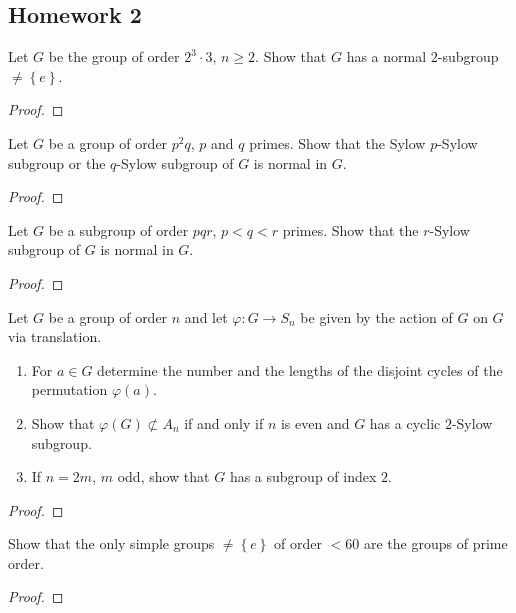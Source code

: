 \subsection{Homework 2}
\begin{problem}
Let $G$ be the group of order $2^3\cdot 3$, $n\geq 2$. Show that $G$ has a
normal $2$-subgroup $\neq\left\{e\right\}$.
\end{problem}
\begin{proof}
\end{proof}

\begin{problem}
Let $G$ be a group of order $p^2q$, $p$ and $q$ primes. Show that the Sylow
$p$-Sylow subgroup or the $q$-Sylow subgroup of $G$ is normal in $G$.
\end{problem}
\begin{proof}
\end{proof}

\begin{problem}
Let $G$ be a subgroup of order $pqr$, $p<q<r$ primes. Show that the
$r$-Sylow subgroup of $G$ is normal in $G$.
\end{problem}
\begin{proof}
\end{proof}

\begin{problem}
Let $G$ be a group of order $n$ and let $\varphi\colon G\to S_n$ be given by
the action of $G$ on $G$ via translation.
\begin{enumerate}[label=(\alph*)]
\item For $a\in G$ determine the number and the lengths of the disjoint
  cycles of the permutation $\varphi(a)$.
\item Show that $\varphi(G)\nsubset A_n$ if and only if $n$ is even and $G$
  has a cyclic $2$-Sylow subgroup.
\item If $n=2m$, $m$ odd, show that $G$ has a subgroup of index $2$.
\end{enumerate}
\end{problem}
\begin{proof}
\end{proof}

\begin{problem}
Show that the only simple groups $\neq\left\{e\right\}$ of order $<60$ are
the groups of prime order.
\end{problem}
\begin{proof}
\end{proof}

